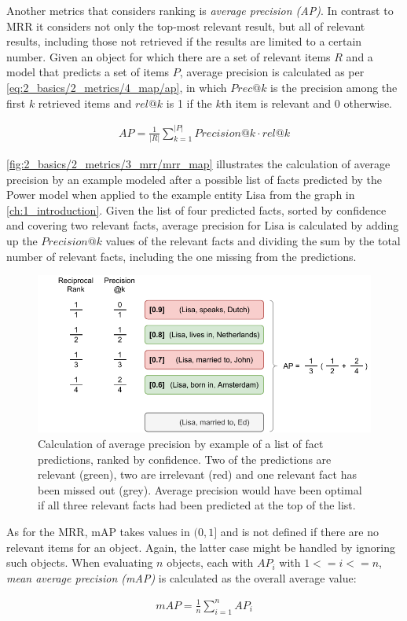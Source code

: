 Another metrics that considers ranking is \emph{average precision (AP)}. In contrast to MRR it considers not only the top-most relevant result, but all of relevant results, including those not retrieved if the results are limited to a certain number. Given an object for which there are a set of relevant items $R$ and a model that predicts a set of items $P$, average precision is calculated as per \autoref{eq:2_basics/2_metrics/4_map/ap}, in which $Prec@k$ is the precision among the first $k$ retrieved items and $rel@k$ is 1 if the $k$th item is relevant and 0 otherwise.

\begin{align}
    AP = \frac{1}{|R|} \sum_{k=1}^{|P|} Precision@k \cdot rel@k
    \label{eq:2_basics/2_metrics/4_map/ap}
\end{align}

\autoref{fig:2_basics/2_metrics/3_mrr/mrr_map} illustrates the calculation of average precision by an example modeled after a possible list of facts predicted by the Power model when applied to the example entity Lisa from the graph in \autoref{ch:1_introduction}. Given the list of four predicted facts, sorted by confidence and covering two relevant facts, average precision for Lisa is calculated by adding up the $Precision@k$ values of the relevant facts and dividing the sum by the total number of relevant facts, including the one missing from the predictions.

\begin{figure}[t]
    \centering
    \includegraphics{2_basics/2_metrics/4_map/mrr_map}
    \caption{Calculation of average precision by example of a list of fact predictions, ranked by confidence. Two of the predictions are relevant (green), two are irrelevant (red) and one relevant fact has been missed out (grey). Average precision would have been optimal if all three relevant facts had been predicted at the top of the list.}
    \label{fig:2_basics/2_metrics/4_map/mrr_map}
\end{figure}

As for the MRR, mAP takes values in $(0, 1]$ and is not defined if there are no relevant items for an object. Again, the latter case might be handled by ignoring such objects. When evaluating $n$ objects, each with $AP_i$ with $1 <= i <= n$, \emph{mean average precision (mAP)} is calculated as the overall average value:

\begin{align}
    mAP = \frac{1}{n} \sum_{i=1}^{n} AP_i
    \label{eq:2_basics/2_metrics/4_map/map}
\end{align}


